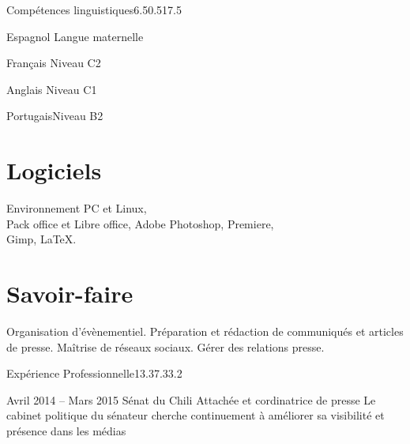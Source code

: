 \documentclass[30pt, french]{tccv}
\begin{document}
\begin{upshape}
\begin{rounded_frame}{Compétences linguistiques}{6.5}{0.5}{17.5}{}


\begin{factlist}
\item{Espagnol} {Langue maternelle}	
\item{Français} {Niveau C2}	
\item{Anglais}  {Niveau C1}	
\item{Portugais}{Niveau B2}
\end{factlist}

\vspace{0.5cm}
\section{Logiciels}
Environnement PC et Linux, \\
Pack office et Libre office,
Adobe Photoshop, Premiere, \\
Gimp,
\LaTeX.

\vspace{0.5cm}
\section{Savoir-faire}
\begin{itemize}[leftmargin=13pt]
  \setlength\itemsep{-3pt} 
  \cvitem[\checkmark]  Organisation d'évènementiel.
  \cvitem[\checkmark]  Préparation et rédaction de communiqués et articles de presse.
  \cvitem[\checkmark]  Maîtrise de réseaux sociaux.
  \cvitem[\checkmark]  Gérer des relations presse.
\end{itemize}



\end{rounded_frame}




%
%



\begin{flat_frame}{Expérience Professionnelle}{13.3}{7.3}{3.2}{}
\begin{eventlist}



\setlength{\parskip}{0pt}
\item{\color{text} Avril 2014 -- Mars 2015}
     {Sénat du Chili}
     {Attachée et cordinatrice de presse}
     \fontsize{9pt}{1em}\color{text}\bodyfontlight\upshape\selectfont
%
 Le cabinet politique du sénateur  cherche continuement à améliorer sa visibilité et présence dans les médias \\ 


\end{eventlist}
\end{flat_frame}
\end{upshape}
\end{document}
